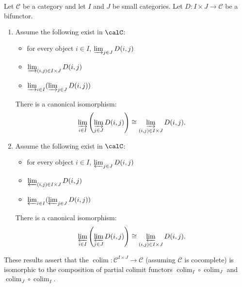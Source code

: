 \begin{theorem} \label{theorem:colimits_commute_with_colimits_and_limits_commute_with_limits}
    Let $\mathcal{C}$ be a category and let $I$ and $J$ be small categories. Let $D: I \times J \to \mathcal{C}$ be a bifunctor. 
    
    \begin{enumerate}
        \item Assume the following  exist in $\calC$:
        \begin{itemize}
            \item for every object $i \in I$, $\varinjlim_{j \in J} D(i, j)$
            \item $\varinjlim_{(i, j) \in I \times J} D(i, j)$
            \item $\varinjlim_{i \in I} (\varinjlim_{j \in J} D(i, j))$
        \end{itemize}
        There is a canonical isomorphism:
        $$
        \varinjlim_{i \in I} \left( \varinjlim_{j \in J} D(i, j) \right) \cong \varinjlim_{(i, j) \in I \times J} D(i, j).
        $$

        \item Assume the following  exist in $\calC$:
        \begin{itemize}
            \item for every object $i \in I$, $\varprojlim_{j \in J} D(i, j)$
            \item $\varprojlim_{(i, j) \in I \times J} D(i, j)$
            \item $\varprojlim_{i \in I} (\varprojlim_{j \in J} D(i, j))$
        \end{itemize}
        There is a canonical isomorphism:
        $$
        \varprojlim_{i \in I} \left( \varprojlim_{j \in J} D(i, j) \right) \cong \varprojlim_{(i, j) \in I \times J} D(i, j).
        $$
    \end{enumerate}
\end{theorem}
\begin{remark}
    These results assert that the  $\operatorname{colim}: \mathcal{C}^{I \times J} \to \mathcal{C}$ (assuming $\mathcal{C}$ is cocomplete) is isomorphic to the composition of partial colimit functors $\operatorname{colim}_I \circ \operatorname{colim}_J$ and $\operatorname{colim}_J \circ \operatorname{colim}_I$.
\end{remark}
